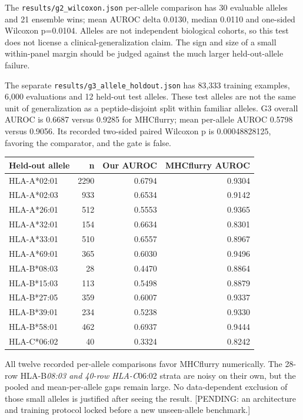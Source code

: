 The \texttt{results/g2\_wilcoxon.json} per-allele comparison has 30 evaluable alleles and 21 ensemble wins; mean AUROC delta 0.0130, median 0.0110 and one-sided Wilcoxon p=0.0104. Alleles are not independent biological cohorts, so this test does not license a clinical-generalization claim. The sign and size of a small within-panel margin should be judged against the much larger held-out-allele failure.


The separate \texttt{results/g3\_allele\_holdout.json} has 83,333 training examples, 6,000 evaluations and 12 held-out test alleles. These test alleles are not the same unit of generalization as a peptide-disjoint split within familiar alleles. G3 overall AUROC is 0.6687 versus 0.9285 for MHCflurry; mean per-allele AUROC 0.5798 versus 0.9056. Its recorded two-sided paired Wilcoxon p is 0.00048828125, favoring the comparator, and the gate is false.

\begin{longtable}[]{@{}lrrr@{}}
\toprule
Held-out allele & n & Our AUROC & MHCflurry AUROC\tabularnewline
\midrule
\endhead
HLA-A*02:01 & 2290 & 0.6794 & 0.9304\tabularnewline
HLA-A*02:03 & 933 & 0.6534 & 0.9142\tabularnewline
HLA-A*26:01 & 512 & 0.5553 & 0.9365\tabularnewline
HLA-A*32:01 & 154 & 0.6634 & 0.8301\tabularnewline
HLA-A*33:01 & 510 & 0.6557 & 0.8967\tabularnewline
HLA-A*69:01 & 365 & 0.6030 & 0.9496\tabularnewline
HLA-B*08:03 & 28 & 0.4470 & 0.8864\tabularnewline
HLA-B*15:03 & 113 & 0.5498 & 0.8879\tabularnewline
HLA-B*27:05 & 359 & 0.6007 & 0.9337\tabularnewline
HLA-B*39:01 & 234 & 0.5238 & 0.9330\tabularnewline
HLA-B*58:01 & 462 & 0.6937 & 0.9444\tabularnewline
HLA-C*06:02 & 40 & 0.3324 & 0.8242\tabularnewline
\bottomrule
\end{longtable}

All twelve recorded per-allele comparisons favor MHCflurry numerically. The 28-row HLA-B\emph{08:03 and 40-row HLA-C}06:02 strata are noisy on their own, but the pooled and mean-per-allele gaps remain large. No data-dependent exclusion of those small alleles is justified after seeing the result. {[}PENDING: an architecture and training protocol locked before a new unseen-allele benchmark.{]}

